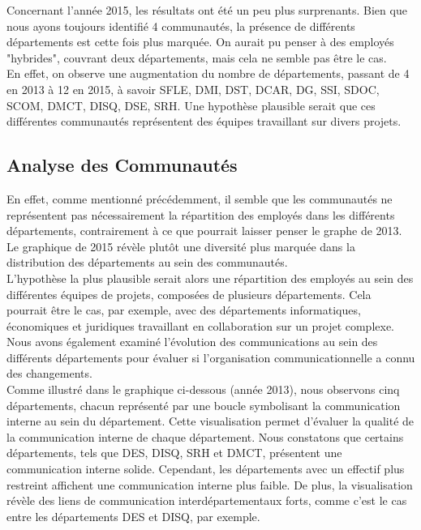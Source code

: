 \documentclass{article}
\begin{document}
Concernant l'année 2015, les résultats ont été un peu plus surprenants. Bien que nous ayons toujours identifié 4 communautés, la présence de différents départements est cette fois plus marquée. On aurait pu penser à des employés "hybrides", couvrant deux départements, mais cela ne semble pas être le cas. \\

En effet, on observe une augmentation du nombre de départements, passant de 4 en 2013 à 12 en 2015, à savoir SFLE, DMI, DST, DCAR, DG, SSI, SDOC, SCOM, DMCT, DISQ, DSE, SRH. Une hypothèse plausible serait que ces différentes communautés représentent des équipes travaillant sur divers projets. \\

\subsection{Analyse des Communautés}

En effet, comme mentionné précédemment, il semble que les communautés ne représentent pas nécessairement la répartition des employés dans les différents départements, contrairement à ce que pourrait laisser penser le graphe de 2013. Le graphique de 2015 révèle plutôt une diversité plus marquée dans la distribution des départements au sein des communautés. \\

L'hypothèse la plus plausible serait alors une répartition des employés au sein des différentes équipes de projets, composées de plusieurs départements. Cela pourrait être le cas, par exemple, avec des départements informatiques, économiques et juridiques travaillant en collaboration sur un projet complexe. \\

Nous avons également examiné l'évolution des communications au sein des différents départements pour évaluer si l'organisation communicationnelle a connu des changements. \\

Comme illustré dans le graphique ci-dessous (année 2013), nous observons cinq départements, chacun représenté par une boucle symbolisant la communication interne au sein du département. Cette visualisation permet d'évaluer la qualité de la communication interne de chaque département. Nous constatons que certains départements, tels que DES, DISQ, SRH et DMCT, présentent une communication interne solide. Cependant, les départements avec un effectif plus restreint affichent une communication interne plus faible. De plus, la visualisation révèle des liens de communication interdépartementaux forts, comme c'est le cas entre les départements DES et DISQ, par exemple.
\end{document}
